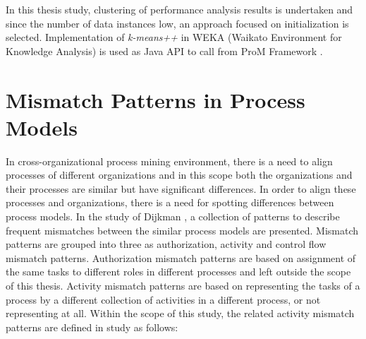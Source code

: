 In this thesis study, clustering of performance analysis results is undertaken and since the number of data instances low, an approach focused on initialization is selected. Implementation of \textit{k-means++} in WEKA (Waikato Environment for Knowledge Analysis) \cite{hall2009} is used as Java API to call from ProM Framework \cite{verbeek2010prom}. 

\section{Mismatch Patterns in Process Models}
\label{sec:mismatch-patterns-in-process-models}

In cross-organizational process mining environment, there is a need to align processes of different organizations and in this scope both the organizations and their processes are similar but have significant differences. In order to align these processes and organizations, there is a need for spotting differences between process models. In the study of Dijkman \cite{dijkman2007mismatch}, a collection of patterns to describe frequent mismatches between the similar process models are presented. Mismatch patterns are grouped into three as authorization, activity and control flow mismatch patterns. Authorization mismatch patterns are based on assignment of the same tasks to different roles in different processes and left outside the scope of this thesis. Activity mismatch patterns are based on representing the tasks of a process by a different collection of activities in a different process, or not representing at all. Within the scope of this study, the related activity mismatch patterns are defined in study \cite{dijkman2007mismatch} as follows:
